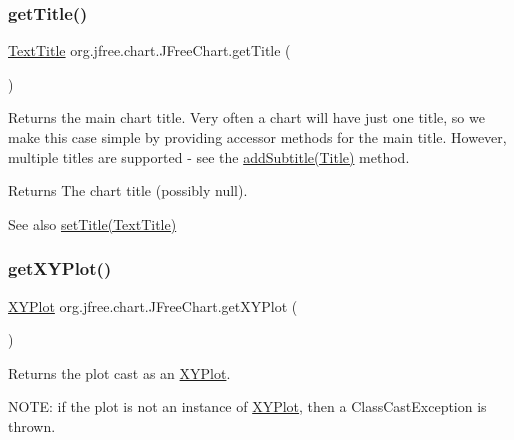 \subsubsection{\texorpdfstring{get\+Title()}{getTitle()}}
{\footnotesize\ttfamily \mbox{\hyperlink{classorg_1_1jfree_1_1chart_1_1title_1_1_text_title}{Text\+Title}} org.\+jfree.\+chart.\+J\+Free\+Chart.\+get\+Title (\begin{DoxyParamCaption}{ }\end{DoxyParamCaption})}

Returns the main chart title. Very often a chart will have just one title, so we make this case simple by providing accessor methods for the main title. However, multiple titles are supported -\/ see the \mbox{\hyperlink{classorg_1_1jfree_1_1chart_1_1_j_free_chart_a511d69d8b64444f31c59761a1c7ba8f8}{add\+Subtitle(\+Title)}} method.

\begin{DoxyReturn}{Returns}
The chart title (possibly {\ttfamily null}).
\end{DoxyReturn}
\begin{DoxySeeAlso}{See also}
\mbox{\hyperlink{classorg_1_1jfree_1_1chart_1_1_j_free_chart_a45064dfb45c9c2a7e6d2ebb8e71be884}{set\+Title(\+Text\+Title)}} 
\end{DoxySeeAlso}
\mbox{\label{classorg_1_1jfree_1_1chart_1_1_j_free_chart_a0a23cad609e1875851f78b8846b356fc}} 
\subsubsection{\texorpdfstring{get\+X\+Y\+Plot()}{getXYPlot()}}
{\footnotesize\ttfamily \mbox{\hyperlink{classorg_1_1jfree_1_1chart_1_1plot_1_1_x_y_plot}{X\+Y\+Plot}} org.\+jfree.\+chart.\+J\+Free\+Chart.\+get\+X\+Y\+Plot (\begin{DoxyParamCaption}{ }\end{DoxyParamCaption})}

Returns the plot cast as an \mbox{\hyperlink{}{X\+Y\+Plot}}. 

N\+O\+TE\+: if the plot is not an instance of \mbox{\hyperlink{}{X\+Y\+Plot}}, then a {\ttfamily Class\+Cast\+Exception} is thrown.

